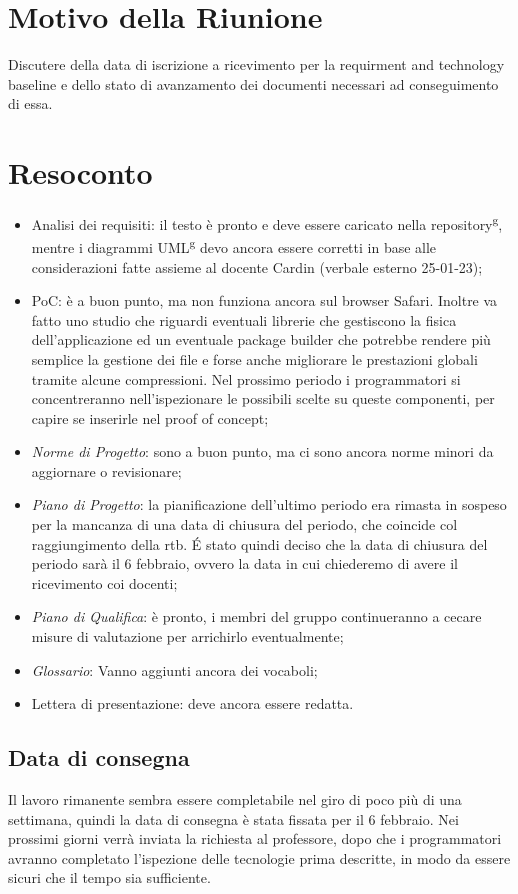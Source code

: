 \section{Motivo della Riunione}
Discutere della data di iscrizione a ricevimento per la requirment and technology baseline e dello stato di avanzamento dei documenti necessari ad conseguimento di essa.
\section{Resoconto}
\begin{itemize}
	\item Analisi dei requisiti: il testo è pronto e deve essere caricato nella repository\textsuperscript{g}, mentre i diagrammi UML\textsuperscript{g} devo ancora essere corretti in base alle considerazioni fatte assieme al docente Cardin (verbale esterno 25-01-23);
	
	\item PoC: è a buon punto, ma non funziona ancora sul browser Safari. Inoltre va fatto uno studio che riguardi eventuali librerie che gestiscono la fisica dell'applicazione ed un eventuale package builder che potrebbe rendere più semplice la gestione dei file e forse anche migliorare le prestazioni globali tramite alcune compressioni. Nel prossimo periodo i programmatori si concentreranno nell'ispezionare le possibili scelte su queste componenti, per capire se inserirle nel proof of concept;
	
	\item \textit{Norme di Progetto}: sono a buon punto, ma ci sono ancora norme minori da aggiornare o revisionare;
	
	\item \textit{Piano di Progetto}: la pianificazione dell'ultimo periodo era rimasta in sospeso per la mancanza di una data di chiusura del periodo, che coincide col raggiungimento della rtb. É stato quindi deciso che la data di chiusura del periodo sarà il 6 febbraio, ovvero la data in cui chiederemo di avere il ricevimento coi docenti;
	
	\item \textit{Piano di Qualifica}: è pronto, i membri del gruppo continueranno a cecare misure di valutazione per arrichirlo eventualmente;
	
	\item \textit{Glossario}: Vanno aggiunti ancora dei vocaboli;

	\item Lettera di presentazione: deve ancora essere redatta.
\end{itemize}

\subsection{Data di consegna}
Il lavoro rimanente sembra essere completabile nel giro di poco più di una settimana, quindi la data di consegna è stata fissata per il 6 febbraio. 
\newline Nei prossimi giorni verrà inviata la richiesta al professore, dopo che i programmatori avranno completato l'ispezione delle tecnologie prima descritte, in modo da essere sicuri che il tempo sia sufficiente.
